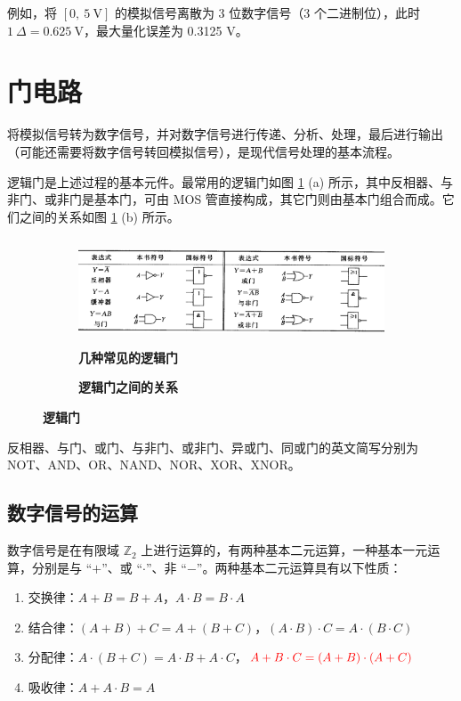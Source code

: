 \documentclass[UTF8]{report}
\def\Z{\mathbb{Z}}
\theoremstyle{MyLineTheoremStyle} %
\theoremstyle{MyBlockTheoremStyle} %
\theoremstyle{MySubsubsectionStyle} %
\begin{document}
例如，将 $[0,\ 5\ \mathrm{V}]$ 的模拟信号离散为 3 位数字信号（3 个二进制位），此时 $1\  \Delta = 0.625\ \mathrm{V}$，最大量化误差为 0.3125 V。


\section{门电路}

将模拟信号转为数字信号，并对数字信号进行传递、分析、处理，最后进行输出（可能还需要将数字信号转回模拟信号），是现代信号处理的基本流程。

逻辑门是上述过程的基本元件。最常用的逻辑门如图 \ref{逻辑门} (a) 所示，其中反相器、与非门、或非门是基本门，可由 MOS 管直接构成，其它门则由基本门组合而成。它们之间的关系如图 \ref{逻辑门} (b) 所示。

\begin{figure}[H]\centering
\begin{subfigure}[t]{0.7\columnwidth}\centering
    \includegraphics[height=90pt]{assets/2/逻辑门.png}
    \caption{\bfseries 几种常见的逻辑门 }
\end{subfigure}\hfill
\begin{subfigure}[t]{0.3\columnwidth}\centering
    
    \caption{\bfseries 逻辑门之间的关系 }
\end{subfigure}
\caption{\bfseries 逻辑门 }\label{逻辑门}
\end{figure}

反相器、与门、或门、与非门、或非门、异或门、同或门的英文简写分别为 NOT、AND、OR、NAND、NOR、XOR、XNOR。

\subsection{数字信号的运算}

数字信号是在有限域 $\Z_2$ 上进行运算的，有两种基本二元运算，一种基本一元运算，分别是与 “$+$”、或 “$\cdot$”、非 “$-$”。两种基本二元运算具有以下性质：

\begin{enumerate}
\item 交换律：$A + B = B + A$，$A \cdot B = B \cdot A$
\item 结合律：$(A + B) + C = A + (B + C)$，$(A \cdot B) \cdot C = A \cdot (B \cdot C)$
\item 分配律：$A \cdot (B + C) = A \cdot B + A \cdot C$，${\color{red} A + B \cdot C = (A + B) \cdot (A + C)}$
\item 吸收律：$A + A \cdot B = A$
\end{enumerate}
\end{document}
